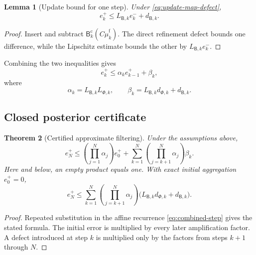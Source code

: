 \documentclass[11pt]{article}
\newtheorem{theorem}{Theorem}[section]
\newtheorem{lemma}[theorem]{Lemma}
\theoremstyle{definition}
\theoremstyle{remark}
\newcommand{\fine}{\mathrm f}
\newcommand{\coarse}{\mathrm c}
\newcommand{\Bup}{\mathsf B}
\begin{document}
\begin{lemma}[Update bound for one step]\label{lem:update-step}
Under \eqref{eq:update-map-defect},
\begin{equation}\label{eq:update-step}
  e_k^+
  \leq
  L_{\Bup,k}e_k^-
  +d_{\Bup,k}.
\end{equation}
\end{lemma}

\begin{proof}
Insert and subtract $\Bup_k^{\coarse}(C\widehat\mu_k^{\fine})$.  The direct refinement defect bounds one difference, while the Lipschitz estimate bounds the other by $L_{\Bup,k}e_k^-$.
\end{proof}

Combining the two inequalities gives
\begin{equation}\label{eq:combined-step}
  e_k^+
  \leq
  \alpha_ke_{k-1}^++\beta_k,
\end{equation}
where
\begin{equation}\label{eq:alpha-beta}
  \alpha_k=L_{\Bup,k}L_{\Phi,k},
  \qquad
  \beta_k=L_{\Bup,k}d_{\Phi,k}+d_{\Bup,k}.
\end{equation}

\subsection{Closed posterior certificate}

\begin{theorem}[Certified approximate filtering]\label{thm:posterior-certificate}
Under the assumptions above,
\begin{equation}\label{eq:posterior-certificate}
  \boxed{
  e_N^+
  \leq
  \left(\prod_{j=1}^N\alpha_j\right)e_0^+
  +
  \sum_{k=1}^N
  \left(\prod_{j=k+1}^N\alpha_j\right)
  \beta_k.}
\end{equation}
Here and below, an empty product equals one.  With exact initial aggregation $e_0^+=0$,
\begin{equation}\label{eq:posterior-certificate-exact-initial}
  e_N^+
  \leq
  \sum_{k=1}^N
  \left(\prod_{j=k+1}^N\alpha_j\right)
  \bigl(L_{\Bup,k}d_{\Phi,k}+d_{\Bup,k}\bigr).
\end{equation}
\end{theorem}

\begin{proof}
Repeated substitution in the affine recurrence \eqref{eq:combined-step} gives the stated formula.  The initial error is multiplied by every later amplification factor.  A defect introduced at step $k$ is multiplied only by the factors from steps $k+1$ through $N$.
\end{proof}
\end{document}
